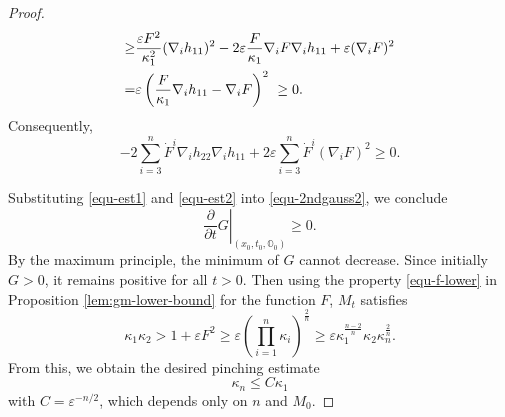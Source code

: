 \documentclass[10pt,a4paper]{amsart}
\begin{document}
\begin{proof}
\begin{align*}
    	\geq & \dfrac{\varepsilon F^2}{\kappa_1^2}(\nabla_i h_{11})^2 - 2\varepsilon\dfrac{F}{\kappa_1}\nabla_i F \nabla_i h_{11} + \varepsilon(\nabla_i F)^2\notag\\
    	=& \varepsilon \left( \dfrac{F}{\kappa_1}\nabla_i h_{11} - \nabla_i F \right)^2\notag~
    	\geq  0.%
    \end{align*}
   Consequently,
    \begin{equation}
    	-2\sum\limits_{i=3}^n \dot{F}^i \nabla_i h_{22}\nabla_i h_{11} + 2\varepsilon \sum\limits_{i=3}^n \dot{F}^i (\nabla_i F)^2 \geq 0.
    	\label{equ-est2}
    \end{equation}

    Substituting \eqref{equ-est1} and \eqref{equ-est2} into \eqref{equ-2ndgauss2}, we conclude
    \begin{equation*}
    	\left.\frac{\partial}{\partial t}G\right|_{(x_0,t_0,\mathbb{O}_0)}\geq 0.
    \end{equation*}
    By the maximum principle, the minimum of $G$ cannot decrease. Since initially $G>0$, it remains positive for all $t>0$. Then using the property \eqref{equ-f-lower} in Proposition \ref{lem:gm-lower-bound} for the function $F$,  $M_t$ satisfies
    \begin{equation*}
    	\kappa_1 \kappa_2 >1+ \varepsilon F^2 \geq \varepsilon \left(\prod_{i=1}^n \kappa_i\right)^{\frac{2}{n}} \geq \varepsilon \kappa_1^{\frac{n-2}{n}} \kappa_2 \kappa_n^{\frac{2}{n}}.
    \end{equation*}
  From this, we obtain the desired pinching estimate 
    \[\kappa_n\leq C\kappa_1\] 
    with $C=\varepsilon^{-n/2}$, which depends only on $n$ and $M_0$.
\end{proof}
\end{document}
